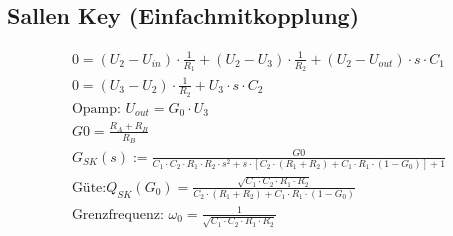 \subsection{Sallen Key (Einfachmitkopplung)}
\begin{figure}[ht]
	\begin{center}
		 \qquad
	\end{center}
\end{figure}
\begin{gather*}
0=(U_2-U_{in})\cdot \frac{1}{R_1}+(U_2-U_3)\cdot \frac{1}{R_2}+(U_2-U_{out})\cdot s\cdot C_1\\
0=(U_3-U_2)\cdot \frac{1}{R_2}+U_3\cdot s\cdot C_2\\
\text{Opamp: }U_{out}=G_0\cdot U_3\\
G0=\frac{R_{A}+R_{B}}{R_{B}}\\
G_{SK}(s):=\frac{G0}{C_1\cdot C_2\cdot R_1\cdot R_2\cdot s^2+s\cdot [C_2\cdot
(R_1+R_2)+C_1\cdot R_1\cdot (1-G_0)]+1}\\
\text{Güte:
}Q_{SK}(G_0)=\frac{\sqrt{C_1\cdot C_2\cdot R_1\cdot R_2}}{C_2\cdot (R_1+R_2)+C_1\cdot R_1\cdot (1-G_0)}\\
\text{Grenzfrequenz: }\omega_0=\frac{1}{\sqrt{C_1\cdot C_2\cdot R_1\cdot R_2}}
\end{gather*}
